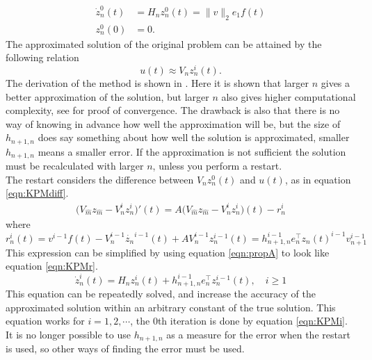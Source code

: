 \begin{equation}
\begin{aligned}
\dot{z}_n^0(t) &= H_n z_n^0(t) = \| v\|_2 e_1 f(t)  \\
z_n^0(0) &= 0.
\label{eqn:KPMi}
\end{aligned}
\end{equation}
The approximated solution of the original problem can be attained by the following relation
\begin{equation}
u(t) \approx V_n z_n^i(t).
\end{equation}
The derivation of the method is shown in \cite{SKRIV NOPE}.
Here it is shown that larger $n$ gives a better approximation of the solution, but larger $n$ also gives higher computational complexity, see \cite{!!!!!!!!!!!arg!!!!!!!!} for proof of convergence. The drawback is also that there is no way of knowing in advance how well the approximation will be, but the size of $h_{n+1,n}$ does say something about how well the solution is approximated, smaller $h_{n+1,n}$ means a smaller error. If the approximation is not sufficient the solution must be recalculated with larger $n$, unless you perform a restart. \\



The restart considers the difference between $V_n z_n^0(t)$ and $u(t)$, as in equation \eqref{eqn:KPMdiff}.
\begin{equation}
\begin{aligned}
\big(V_{\hat{m}}z_{\hat{m}} -V_n^i z_n^i \big) '(t)=A \big( V_{\hat{m}}z_{\hat{m}} -V_n^i z_n^i \big) (t)  - r_n^i
\end{aligned}
\label{eqn:KPMdiff}
\end{equation}
where 
\begin{equation}
r_n^i (t) = v^{i-1} f(t) - V_n^{i-1} \dot{z_n}^{i-1}(t) + A V_n^{i-1} z_n^{i-1}(t) = h_{n+1,n}^{i-1} e_n^{\top} z_n(t)^{i-1} v_{n+1}^{i-1}
\end{equation}
This expression can be simplified by using equation \eqref{eqn:propA} to look like equation \eqref{eqn:KPMr}.
\begin{equation}
\dot{z}^{i}_n(t) = H_n z_n^i(t) + h_{n+1,n}^{i-1} e^\top_n z_n^{i-1}(t), \quad i \geq 1
\label{eqn:KPMr}
\end{equation}
This equation can be repeatedly solved, and increase the accuracy of the approximated solution within an arbitrary constant of the true solution. This equation works for $i = 1,2,\cdots$, the $0$th iteration is done by equation \eqref{eqn:KPMi}. It is no longer possible to use $h_{n+1,n}$ as a measure for the error when the restart is used, so other ways of finding the error must be used.\\

